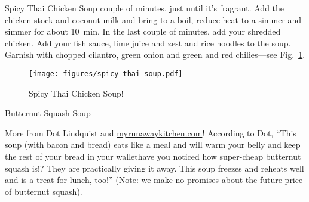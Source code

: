 \begin{entry}{Spicy Thai Chicken Soup}
couple of minutes, just until it's fragrant. Add the chicken stock and coconut
milk and bring to a boil, reduce heat to a simmer and simmer for about
\SI{10}{\minute}. In the last couple of minutes, add your shredded chicken. Add
your fish sauce, lime juice and zest and rice noodles to the soup. Garnish with
chopped cilantro, green onion and green and red chilies---see
Fig.~\ref{fig:spicy-thai-soup}.
\begin{figure}
    \centering
    \texttt{[image: figures/spicy-thai-soup.pdf]}
    \caption{Spicy Thai Chicken Soup!}
    \label{fig:spicy-thai-soup}
\end{figure}
\end{entry}

\begin{entry}{Butternut Squash Soup}

\begin{open}
  More from Dot Lindquist and \url{myrunawaykitchen.com}! According to Dot,
  ``This soup (with bacon and bread) eats like a meal and will warm your belly
  and keep the rest of your bread in your wallet\textellipsis have you noticed
  how super-cheap butternut squash is!?  They are practically giving it away.
  This soup freezes and reheats well and is a treat for lunch, too!'' (Note:
  we make no promises about the future price of butternut squash).


\end{open}
\end{entry}
